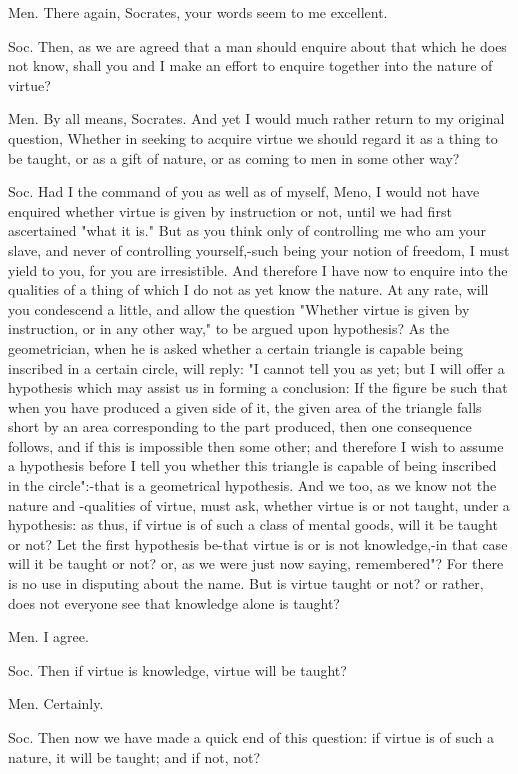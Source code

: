 Men. There again, Socrates, your words seem to me excellent.

Soc. Then, as we are agreed that a man should enquire about that which
he does not know, shall you and I make an effort to enquire together
into the nature of virtue? 

Men. By all means, Socrates. And yet I would much rather return to
my original question, Whether in seeking to acquire virtue we should
regard it as a thing to be taught, or as a gift of nature, or as coming
to men in some other way? 

Soc. Had I the command of you as well as of myself, Meno, I would
not have enquired whether virtue is given by instruction or not, until
we had first ascertained "what it is." But as you think only of controlling
me who am your slave, and never of controlling yourself,-such being
your notion of freedom, I must yield to you, for you are irresistible.
And therefore I have now to enquire into the qualities of a thing
of which I do not as yet know the nature. At any rate, will you condescend
a little, and allow the question "Whether virtue is given by instruction,
or in any other way," to be argued upon hypothesis? As the geometrician,
when he is asked whether a certain triangle is capable being inscribed
in a certain circle, will reply: "I cannot tell you as yet; but I
will offer a hypothesis which may assist us in forming a conclusion:
If the figure be such that when you have produced a given side of
it, the given area of the triangle falls short by an area corresponding
to the part produced, then one consequence follows, and if this is
impossible then some other; and therefore I wish to assume a hypothesis
before I tell you whether this triangle is capable of being inscribed
in the circle":-that is a geometrical hypothesis. And we too, as we
know not the nature and -qualities of virtue, must ask, whether virtue
is or not taught, under a hypothesis: as thus, if virtue is of such
a class of mental goods, will it be taught or not? Let the first hypothesis
be-that virtue is or is not knowledge,-in that case will it be taught
or not? or, as we were just now saying, remembered"? For there is
no use in disputing about the name. But is virtue taught or not? or
rather, does not everyone see that knowledge alone is taught?

Men. I agree. 

Soc. Then if virtue is knowledge, virtue will be taught?

Men. Certainly. 

Soc. Then now we have made a quick end of this question: if virtue
is of such a nature, it will be taught; and if not, not?

